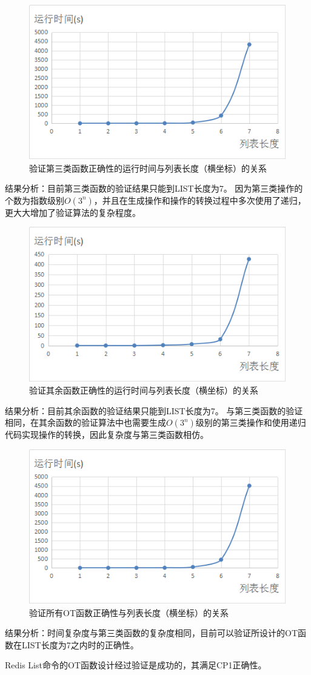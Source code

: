 \begin{figure}[H]
\centering
\includegraphics{figures/runtime3.bmp}
\caption{验证第三类函数正确性的运行时间与列表长度（横坐标）的关系}
\end{figure}
\par 结果分析：目前第三类函数的验证结果只能到LIST长度为7。
因为第三类操作的个数为指数级别$O(3^n)$，并且在生成操作和操作的转换过程中多次使用了递归，更大大增加了验证算法的复杂程度。

\begin{figure}[H]
\centering
\includegraphics{figures/runtime4.bmp}
\caption{验证其余函数正确性的运行时间与列表长度（横坐标）的关系}
\end{figure}
\par 结果分析：目前其余函数的验证结果只能到LIST长度为7。
与第三类函数的验证相同，在其余函数的验证算法中也需要生成$O(3^n)$级别的第三类操作和使用递归代码实现操作的转换，因此复杂度与第三类函数相仿。

\begin{figure}[H]
\centering
\includegraphics{figures/runtimeall.bmp}
\caption{验证所有OT函数正确性与列表长度（横坐标）的关系}
\end{figure}
\par 结果分析：时间复杂度与第三类函数的复杂度相同，目前可以验证所设计的OT函数在LIST长度为7之内时的正确性。

Redis List命令的OT函数设计经过验证是成功的，其满足CP1正确性。